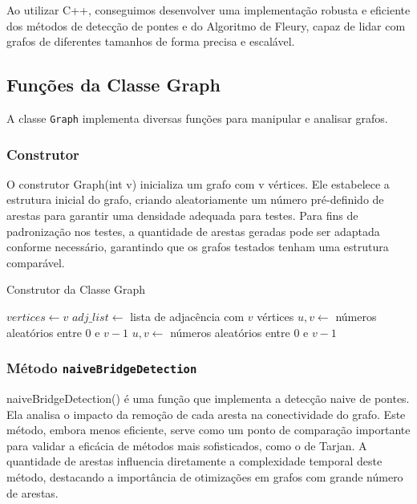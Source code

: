 \documentclass[12pt]{article}
\begin{document}
Ao utilizar C++, conseguimos desenvolver uma implementação robusta e eficiente dos métodos de detecção de pontes e do Algoritmo de Fleury, capaz de lidar com grafos de diferentes tamanhos de forma precisa e escalável.
\newpage
\subsection{Funções da Classe Graph}
A classe \texttt{Graph} implementa diversas funções para manipular e analisar grafos.
\subsubsection{Construtor}

O construtor Graph(int v) inicializa um grafo com v vértices. Ele estabelece a estrutura inicial do grafo, criando aleatoriamente um número pré-definido de arestas para garantir uma densidade adequada para testes. Para fins de padronização nos testes, a quantidade de arestas geradas pode ser adaptada conforme necessário, garantindo que os grafos testados tenham uma estrutura comparável.

\begin{algorithm}[H]
\caption{Construtor da Classe Graph}
\begin{algorithmic}[1]
    \State $vertices \gets v$
    \State $adj\_list \gets$ lista de adjacência com $v$ vértices
        \State $u, v \gets$ números aleatórios entre $0$ e $v-1$
            \State $u, v \gets$ números aleatórios entre $0$ e $v-1$
        \EndWhile
        \State {} 
    \EndFor
\EndFunction
\end{algorithmic}
\end{algorithm}
\subsubsection{Método \texttt{naiveBridgeDetection}}

naiveBridgeDetection() é uma função que implementa a detecção naive de pontes. Ela analisa o impacto da remoção de cada aresta na conectividade do grafo. Este método, embora menos eficiente, serve como um ponto de comparação importante para validar a eficácia de métodos mais sofisticados, como o de Tarjan. A quantidade de arestas influencia diretamente a complexidade temporal deste método, destacando a importância de otimizações em grafos com grande número de arestas.
\end{document}
